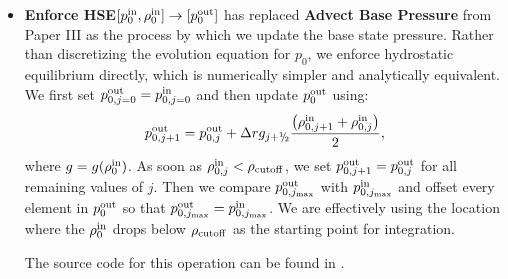 \begin{itemize}
\item {\bf Enforce HSE}$[p_0^{\mathrm{in}},\rho_0^{\mathrm{in}}]
  \rightarrow [p_0^{\mathrm{out}}]$ has replaced {\bf Advect Base Pressure}
  from Paper III as the process by which we update the base state
  pressure.  Rather than discretizing the evolution equation for
  $p_0$, we enforce hydrostatic equilibrium directly, which is numerically simpler
  and analytically equivalent.  We first set 
  $p_{0,j=0}^{\mathrm{out}} = p_{0,j=0}^{\mathrm{in}}$ and then update $p_0^{\mathrm{out}}$ using:
\begin{equation}
p_{0,j+1}^{\outp} = p_{0,j}^{\outp} + \Delta r g_{j+\myhalf}\frac{\left(\rho_{0,j+1}^{\inp}+\rho_{0,j}^{\inp}\right)}{2},
\end{equation}
  where $g=g(\rho_0^{\mathrm{in}})$.  As soon as $\rho_{0,j}^{\mathrm{in}} < \rho_{\rm cutoff}$, we set 
  $p_{0,j+1}^{\mathrm{out}} = p_{0,j}^{\mathrm{out}}$ for all remaining values of $j$.  
  Then we compare $p_{0,j_{\rm max}}^{\mathrm{out}}$ with $p_{0,j_{\rm max}}^{\mathrm{in}}$ and offset
  every element in $p_0^{\mathrm{out}}$ so that $p_{0,j_{\rm max}}^{\mathrm{out}} = p_{0,j_{\rm max}}^{\mathrm{in}}$.  
  We are effectively using the location where the $\rho_0^{\mathrm{in}}$ drops below 
  $\rho_{\rm cutoff}$ as the starting point for integration.

The source code for this operation can be found in .



\end{itemize}

